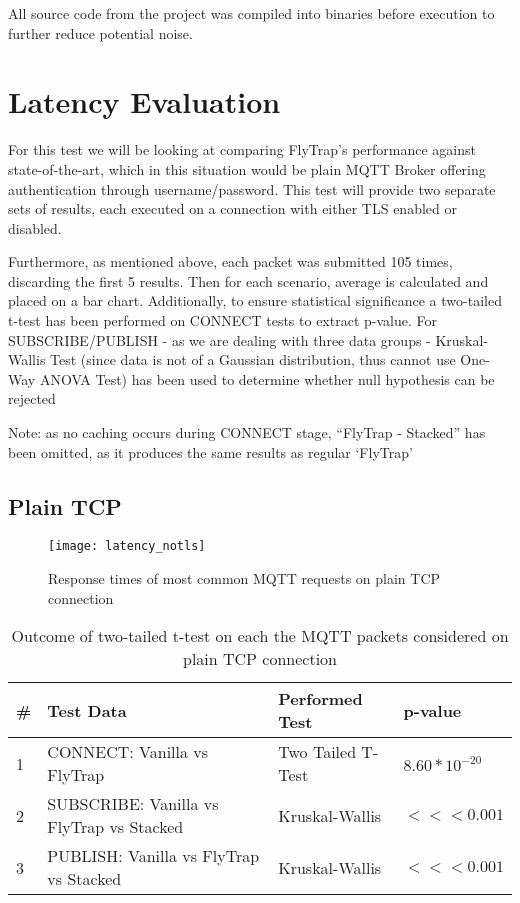 All source code from the project was compiled into binaries before execution to further reduce potential noise.

\section{Latency Evaluation}
For this test we will be looking at comparing FlyTrap's performance against state-of-the-art, which in this situation would be plain MQTT Broker offering authentication through username/password. This test will provide two separate sets of results, each executed on a connection with either TLS enabled or disabled.

Furthermore, as mentioned above, each packet was submitted 105 times, discarding the first 5 results. Then for each scenario, average is calculated and placed on a bar chart. Additionally, to ensure statistical significance a two-tailed t-test has been performed on CONNECT tests to extract p-value. For SUBSCRIBE/PUBLISH - as we are dealing with three data groups - Kruskal-Wallis Test (since data is not of a Gaussian distribution, thus cannot use One-Way ANOVA Test) has been used to determine whether null hypothesis can be rejected

Note: as no caching occurs during CONNECT stage, ``FlyTrap - Stacked'' has been omitted, as it produces the same results as regular `FlyTrap'
\subsection{Plain TCP}
\begin{figure}[h]
    \centering
    \texttt{[image: latency\_notls]}
    \caption{Response times of most common MQTT requests on plain TCP connection}
    \label{fig:latency_notls}
\end{figure}

\begin{table}[]
\centering
\begin{tabular}{|l|l|l|l|}
\hline
\textbf{\#} & \textbf{Test Data}                       & \textbf{Performed Test} & \textbf{p-value}                      \\ \hline
1           & CONNECT: Vanilla vs FlyTrap              & Two Tailed T-Test       & $8.60*10^{-20}$                    \\ \hline
2           & SUBSCRIBE: Vanilla vs FlyTrap vs Stacked & Kruskal-Wallis          & $<<< 0.001$ \\ \hline
3           & PUBLISH: Vanilla vs FlyTrap vs Stacked & Kruskal-Wallis          & $<<< 0.001$ \\ \hline
\end{tabular}
\caption{Outcome of two-tailed t-test on each the MQTT packets considered on plain TCP connection}
\label{tab:ttest-notls}
\end{table}

